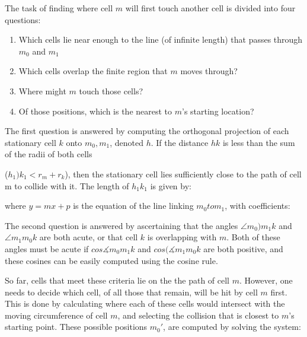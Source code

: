 \documentclass[11.5pt]{article}
\begin{document}
The task of finding where cell \(m\) will first touch another 
cell is divided into four questions:

\begin{enumerate}
\item Which cells lie near enough to the line (of infinite length) that 
passes through \(m_0\) and \(m_1\)
\item Which cells overlap the finite region that \(m\) moves 
through?
\item Where might \(m\) touch those cells?
\item Of those positions, which is the nearest to \(m\)'s 
starting location?
\end{enumerate}

The first question is answered by computing the orthogonal projection of 
each stationary cell \(k\) onto \(m_0,m_1\), denoted 
\(h\). If the distance \(hk\) is less than the sum of the radii of both cells 

\newpage

(\(h_1)k_1 < r_m + r_k\)), then the 
stationary cell lies sufficiently close to the path of cell m to collide 
with it. The length of \(h_1k_1\) is given by:

\begin{figure}[H]
\centering
\end{figure}

where \(y = mx + p\) is the equation of the line linking \(m_0
 to m_1\), with coefficients:

\begin{figure}[H]
\centering
\end{figure}

The second question is answered by ascertaining that the angles \(\angle m_0
)m_1k\) and \(\angle m_1m_0k\) are both acute, or that 
cell \(k\) is overlapping with \(m\). Both of these angles 
must be acute if \(cos\measuredangle m_0m_1k\) and \(cos(\measuredangle m_1m_0k\) are 
both positive, and these cosines can be easily computed 
using the cosine rule.

So far, cells that meet these criteria lie on the the path of cell 
\(m\). However, one needs to decide which cell, of all those 
that remain, will be hit by cell \(m\) first. This is done by 
calculating where each of these cells would intersect with the moving 
circumference of cell \(m\), and selecting the collision that is closest to 
\(m\)'s starting point. These possible positions \(m_0'\), 
are computed by solving the system:
\end{document}
